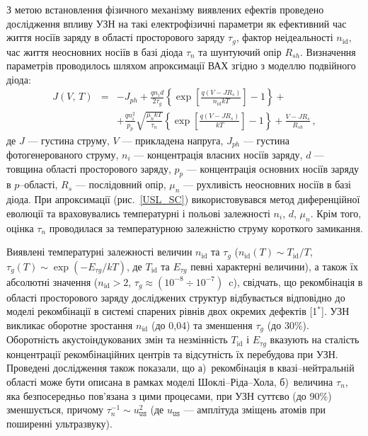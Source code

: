 З метою встановлення фізичного механізму виявлених ефектів проведено дослідження впливу УЗН на такі електрофізичні параметри як
ефективний час життя носіїв заряду в області просторового заряду $\tau_{g}$,
фактор неідеальності $n_\mathrm{id}$,
час життя неосновних носіїв в базі діода $\tau_n$
та шунтуючий опір $R_{sh}$.
Визначення параметрів проводилось шляхом апроксимації ВАХ згідно з моделлю подвійного діода:
\begin{eqnarray}
\label{eqSSCIV}
\nonumber J(V,\,T)&=&-J_{ph}+\frac{qn_id}{2\tau_{g}}\left\{\exp \left[\frac{q(V-JR_s)}{n_\mathrm{id}kT}\right]-1\right\}+\\
&&+\frac{qn_i^2}{p_p}\sqrt{\frac{\mu_nkT}{\tau_n}}\left\{\exp \left[\frac{q(V-JR_s)}{kT}\right]-1\right\}+\frac{V-JR_s}{R_{sh}}\,,
\end{eqnarray}
де
$J$ --- густина струму,
$V$ --- прикладена напруга,
$J_{ph}$ --- густина фотогенерованого струму,
$n_i$ --- концентрація власних носіїв заряду,
$d$ --- товщина області просторового заряду,
$p_p$ --- концентрація основних носіїв заряду в $p$--області,
$R_s$ --- послідовний опір,
$\mu_n$ --- рухливість неосновних носіїв в базі діода.
При апроксимації (рис.~\ref{USL_SC}) використовувався метод диференційної еволюції та враховувались температурні і польові залежності $n_i$, $d$, $\mu_n$.
Крім того, оцінка $\tau_n$ проводилася за температурною залежністю струму короткого замикання.

Виявлені температурні залежності величин $n_\mathrm{id}$ та $\tau_g$
($n_{\mathrm{id}}(T) \sim T_{\mathrm{id}}/T$,
$\tau_{g}(T)\sim\exp\left(-E_{\tau g}/kT\right)$,
де $T_{\mathrm{id}}$ та $E_{\tau g}$ певні характерні величини),
а також їх абсолютні значення ($n_{\mathrm{id}}>2$, $\tau_{g}\approx(10^{-8}\div10^{-7})$~c),
свідчать, що рекомбінація в області просторового заряду досліджених структур
відбувається відповідно до
моделі рекомбінації в системі спарених рівнів двох окремих дефектів
[1$^*$].
УЗН викликає оборотне зростання $n_\mathrm{id}$  (до 0,04) та зменшення $\tau_g$ (до 30\%).
Оборотність акустоіндукованих змін та незмінність $T_{\mathrm{id}}$ і $E_{\tau g}$
вказують на
сталість концентрації рекомбінаційних центрів та відсутність їх перебудова при УЗН.
Проведені дослідження також показали, що
а)~рекомбінація в квазі--нейтральній області може бути описана в рамках моделі Шоклі--Ріда--Хола,
б)~величина $\tau_n$, яка безпосередньо пов'язана з цими процесами,
при УЗН суттєво (до 90\%) зменшується,
причому
$\tau_{n}^{-1}\sim u_\mathtt{US}^2$ (де $u_\mathtt{US}$ --- амплітуда зміщень атомів при поширенні ультразвуку).

